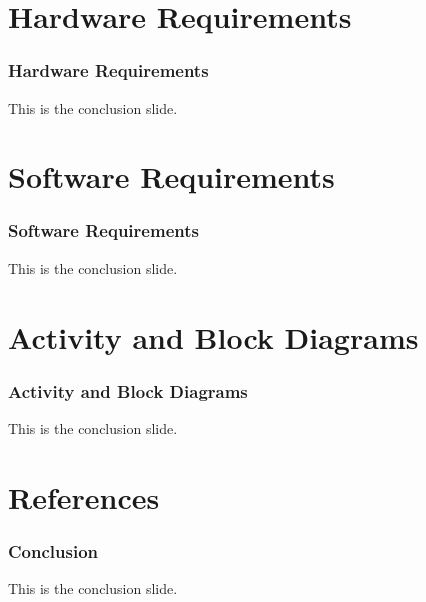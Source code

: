 \documentclass[aspectratio=169]{beamer}
\begin{document}
\section{Hardware Requirements}
\begin{frame}
  \frametitle{Hardware Requirements}
  This is the conclusion slide.
\end{frame}

\section{Software Requirements}
\begin{frame}
  \frametitle{Software Requirements}
  This is the conclusion slide.
\end{frame}

\section{Activity and Block Diagrams}
\begin{frame}
  \frametitle{Activity and Block Diagrams}
  This is the conclusion slide.
\end{frame}


\section{References}
\begin{frame}
  \frametitle{Conclusion}
  This is the conclusion slide.
\end{frame}
\end{document}
